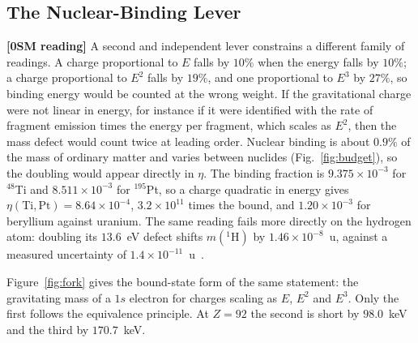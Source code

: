 \documentclass[%
 reprint, amsmath,amssymb, aps, prb, ]{revtex4-2}
\numberwithin{equation}{section}
\begin{document}
\subsection{The Nuclear-Binding Lever}
\label{subsec:nuclear_lever}

\textbf{[0SM reading]} A second and independent lever constrains a different family of readings. A charge proportional to $E$ falls by $10\%$ when the energy falls by $10\%$; a charge proportional to $E^{2}$ falls by $19\%$, and one proportional to $E^{3}$ by $27\%$, so binding energy would be counted at the wrong weight. If the gravitational charge were not linear in energy, for instance if it were identified with the rate of fragment emission times the energy per fragment, which scales as $E^{2}$, then the mass defect would count twice at leading order. Nuclear binding is about $0.9\%$ of the mass of ordinary matter and varies between nuclides (Fig.~\ref{fig:budget}), so the doubling would appear directly in $\eta$. The binding fraction is $9.375\times10^{-3}$ for $^{48}$Ti and $8.511\times10^{-3}$ for $^{195}$Pt, so a charge quadratic in energy gives $\eta(\mathrm{Ti},\mathrm{Pt}) = 8.64\times10^{-4}$, $3.2\times10^{11}$ times the bound, and $1.20\times10^{-3}$ for beryllium against uranium. The same reading fails more directly on the hydrogen atom: doubling its $13.6$~eV defect shifts $m(^{1}\mathrm{H})$ by $1.46\times10^{-8}$~u, against a measured uncertainty of $1.4\times10^{-11}$~u~\cite{ame2020}.

Figure~\ref{fig:fork} gives the bound-state form of the same statement: the gravitating mass of a $1s$ electron for charges scaling as $E$, $E^{2}$ and $E^{3}$. Only the first follows the equivalence principle. At $Z = 92$ the second is short by $98.0$~keV and the third by $170.7$~keV.
\end{document}
